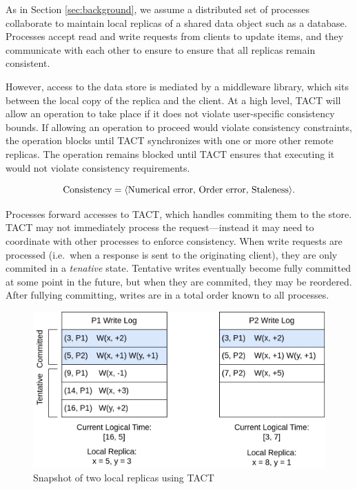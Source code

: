 \documentclass[]             %
{NASA}                       %
\theoremstyle{definition}
\begin{document}

As in Section \ref{sec:background}, we assume a distributed set of
processes collaborate to maintain local replicas of a shared data object
such as a database. Processes accept read and write requests from
clients to update items, and they communicate with each other to ensure
to ensure that all replicas remain consistent.

However, access to the data store is mediated by a middleware library,
which sits between the local copy of the replica and the client. At a
high level, TACT will allow an operation to take place if it does not
violate user-specific consistency bounds. If allowing an operation to
proceed would violate consistency constraints, the operation blocks
until TACT synchronizes with one or more other remote replicas. The
operation remains blocked until TACT ensures that executing it would
not violate consistency requirements.

\[\textrm{Consistency} = \langle \textrm{Numerical error, \textrm{Order error}, \textrm{Staleness}} \rangle.\]

Processes forward accesses to TACT, which handles commiting them to the
store. TACT may not immediately process the request---instead it may
need to coordinate with other processes to enforce consistency. When
write requests are processed (i.e.~when a response is sent to the
originating client), they are only commited in a \emph{tenative} state.
Tentative writes eventually become fully committed at some point in the
future, but when they are commited, they may be reordered. After
fullying committing, writes are in a total order known to all processes.

\begin{figure}[h]
  \center
  \includegraphics[scale=0.4]{images/TACT Logs.png}
  \caption{Snapshot of two local replicas using TACT}
  \label{fig:tact_logs}
\end{figure}
\end{document}
